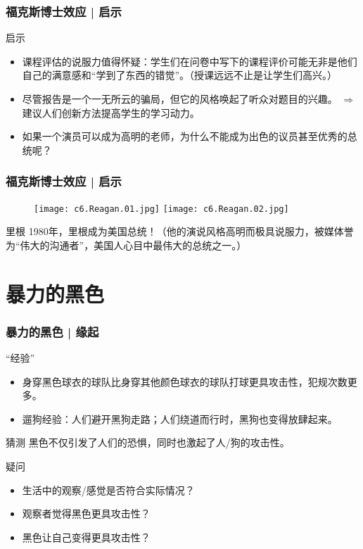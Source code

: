 \begin{frame}
  \frametitle{福克斯博士效应 | 启示}
  \begin{block}{启示}
    \begin{itemize}
      \item \alert{课程评估的说服力值得怀疑}：学生们在问卷中写下的课程评价可能无非是他们自己的满意感和“学到了东西的错觉”。（授课远远不止是让学生们高兴。）
      \item 尽管报告是一个一无所云的骗局，但它的风格唤起了听众对题目的兴趣。 $\Longrightarrow$ 建议人们\alert{创新方法提高学生的学习动力}。
      \item 如果一个演员可以成为高明的老师，为什么不能成为出色的议员甚至优秀的总统呢？
    \end{itemize}
  \end{block}
\end{frame}

\begin{frame}
  \frametitle{福克斯博士效应 | 启示}
  \begin{figure}
    \centering
    \texttt{[image: c6.Reagan.01.jpg]}\quad
    \texttt{[image: c6.Reagan.02.jpg]}
  \end{figure}
  \pause
  \begin{block}{里根}
 1980年，里根成为美国总统！（他的演说风格高明而极具说服力，被媒体誉为“伟大的沟通者”，美国人心目中最伟大的总统之一。） 
  \end{block}
\end{frame}

\section{暴力的黑色}
\begin{frame}
  \frametitle{暴力的黑色 | 缘起}
  \begin{block}{“经验”}
    \begin{itemize}
      \item 身穿黑色球衣的球队比身穿其他颜色球衣的球队打球更具攻击性，犯规次数更多。
      \item 遛狗经验：人们避开黑狗走路；人们绕道而行时，黑狗也变得放肆起来。
    \end{itemize}
  \end{block}
  \pause
  \begin{block}{猜测}
    黑色不仅引发了人们的恐惧，同时也激起了人/狗的攻击性。
  \end{block}
  \pause
  \begin{block}{疑问}
    \begin{itemize}
      \item 生活中的观察/感觉是否符合实际情况？
      \item 观察者觉得黑色更具攻击性？
      \item 黑色让自己变得更具攻击性？
    \end{itemize}
  \end{block}
\end{frame}

